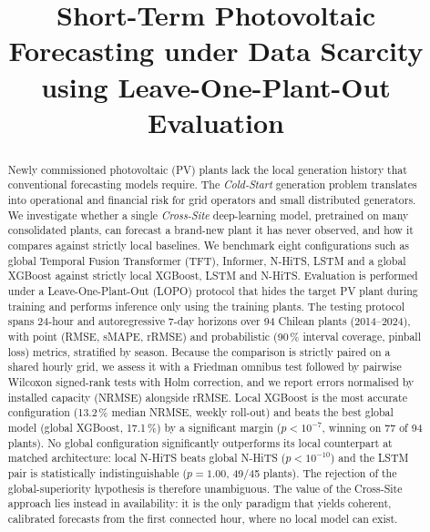 \documentclass[conference]{IEEEtran}
\begin{document}

\title{Short-Term Photovoltaic Forecasting under Data Scarcity using Leave-One-Plant-Out Evaluation}

\author{
}

\maketitle

\begin{abstract}
Newly commissioned photovoltaic (PV) plants lack the local generation history that
conventional forecasting models require. The \emph{Cold-Start} generation problem translates into
operational and financial risk for grid operators and small distributed generators. We
investigate whether a single \emph{Cross-Site} deep-learning model, pretrained on many
consolidated plants, can forecast a brand-new plant it has never observed, and how it
compares against strictly local baselines. We benchmark eight configurations such as global
Temporal Fusion Transformer (TFT), Informer, N-HiTS, LSTM and a global XGBoost against
strictly local XGBoost, LSTM and N-HiTS. Evaluation is performed under a Leave-One-Plant-Out (LOPO) protocol that
hides the target PV plant during training and performs inference only using the training plants. The testing protocol
spans 24-hour and autoregressive 7-day horizons over 94 Chilean plants (2014--2024), with
point (RMSE, sMAPE, rRMSE) and probabilistic (90\,\% interval coverage, pinball loss)
metrics, stratified by season. Because the comparison is strictly paired on a shared hourly
grid, we assess it with a Friedman omnibus test followed by pairwise Wilcoxon signed-rank
tests with Holm correction, and we report errors normalised by installed capacity (NRMSE)
alongside rRMSE. Local XGBoost is the most accurate configuration (13.2\,\% median NRMSE,
weekly roll-out) and beats the best global model (global XGBoost, 17.1\,\%) by a significant
margin ($p<10^{-7}$, winning on 77 of 94 plants). No global configuration significantly
outperforms its local counterpart at matched architecture: local N-HiTS beats global N-HiTS
($p<10^{-10}$) and the LSTM pair is statistically indistinguishable ($p=1.00$, 49/45 plants).
The rejection of the global-superiority hypothesis is therefore unambiguous. The value of the
Cross-Site approach lies instead in availability: it is the only paradigm that yields
coherent, calibrated forecasts from the first connected hour, where no local model can exist.
\end{abstract}
\end{document}
